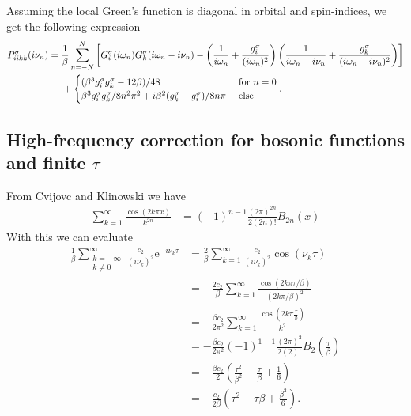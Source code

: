 \documentclass[12pt,a4paper]{scrartcl}
\numberwithin{equation}{section}
\begin{document}
Assuming the local Green's function is diagonal in orbital and spin-indices,
we get the following expression
\begin{align}
 P^{\sigma}_{iikk}(i\nu_n)
%
 &=\frac{1}{\beta} \sum_{n=-N}^{N}\left[ G^{\sigma}_{i}(i\omega_n)
                                   G^{\sigma}_{k}(i\omega_n-i\nu_n)
           -\left( \frac{1}{i\omega_n} + \frac{g^{\sigma}_{i}}{(i\omega_n)^2}\right)
            \left(\frac{1}{i\omega_n-i\nu_n} + \frac{g^{\sigma}_{k}}{(i\omega_n-i\nu_n)^2}\right)\right] \nonumber \\
%
&\hspace{0.5cm}+ 
\begin{cases}
  (\beta^3 g^{\sigma}_{i}g^{\sigma}_{k} - 12\beta)/48 & \mbox{ for } n=0 \\
  \beta^3 g^{\sigma}_{i}g^{\sigma}_{k}/8n^2\pi^2
  + i \beta^2 (g^{\sigma}_{k}-g^{\sigma}_{i}) / 8n\pi & \mbox{ else} 
\end{cases}.
\end{align}


\subsection{High-frequency correction for bosonic functions and finite $\tau$}
From Cvijovc and Klinowski we have
\begin{align}
 \sum_{k=1}^{\infty} \frac{\cos(2k\pi x)}{k^{2n}}
 &= (-1)^{n-1} \frac{(2\pi)^{2n}}{2(2n)!} B_{2n}(x)
\end{align}
With this we can evaluate
\begin{align}
 \frac{1}{\beta}\sum_{\substack{k=-\infty \\ k\neq 0}}^{\infty} \frac{c_2}{(i\nu_k)^2} \mathrm{e}^{-i\nu_k \tau} 
 &=\frac{2}{\beta}\sum_{ k=1}^{\infty} \frac{c_2}{(i\nu_k)^2} \cos(\nu_k \tau) \\
 &=-\frac{2c_2}{\beta}\sum_{ k=1}^{\infty} \frac{\cos(2k\pi \tau/\beta) }{(2k\pi/\beta)^2}  \\
 &=-\frac{\beta c_2}{2\pi^2}\sum_{ k=1}^{\infty} \frac{\cos(2k\pi \frac{\tau}{\beta}) }{k^2}  \\
 &=-\frac{\beta c_2}{2\pi^2} (-1)^{1-1} \frac{(2\pi)^{2}}{2(2)!} B_{2}(\frac{\tau}{\beta}) \\
 &=-\frac{\beta c_2}{2} \left( \frac{\tau^2}{\beta^2} - \frac{\tau}{\beta} + \frac{1}{6} \right) \\
 &=-\frac{c_2}{2\beta } \left( \tau^2 - \tau \beta + \frac{\beta^2}{6} \right) .
\end{align}
\end{document}
